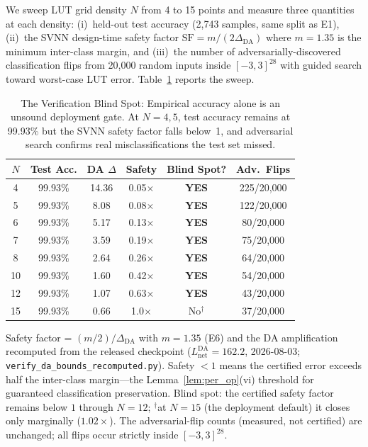 \documentclass[journal,onecolumn]{IEEEtran}
\begin{document}
We sweep LUT grid density $N$ from 4 to 15 points and measure three quantities
at each density: (i)~held-out test accuracy (2,743 samples, same split as E1),
(ii)~the SVNN design-time safety factor $\text{SF} = m/(2\Delta_{\text{DA}})$
where $m=1.35$ is the minimum inter-class margin, and (iii)~the number of
adversarially-discovered classification flips from 20,000 random inputs inside
$[-3,3]^{28}$ with guided search toward worst-case LUT error.
Table~\ref{tab:blind_spot} reports the sweep.

\begin{table}[t]
\centering
\caption{The Verification Blind Spot: Empirical accuracy alone is an unsound
deployment gate. At $N=4,5$, test accuracy remains at 99.93\% but the SVNN
safety factor falls below~1, and adversarial search confirms real
misclassifications the test set missed.}
\label{tab:blind_spot}
\footnotesize
\begin{tabular}{@{}cccccc@{}}
\toprule
\textbf{$N$} & \textbf{Test Acc.} & \textbf{DA $\Delta$} &
\textbf{Safety} & \textbf{Blind Spot?} & \textbf{Adv.\ Flips} \\
\midrule
4  & 99.93\% & 14.36 & 0.05$\times$ & \textbf{YES} & 225/20,000 \\
5  & 99.93\% & 8.08  & 0.08$\times$ & \textbf{YES} & 122/20,000 \\
6  & 99.93\% & 5.17  & 0.13$\times$ & \textbf{YES} & 80/20,000 \\
7  & 99.93\% & 3.59  & 0.19$\times$ & \textbf{YES} & 75/20,000 \\
8  & 99.93\% & 2.64  & 0.26$\times$ & \textbf{YES} & 64/20,000 \\
10 & 99.93\% & 1.60  & 0.42$\times$ & \textbf{YES} & 54/20,000 \\
12 & 99.93\% & 1.07  & 0.63$\times$ & \textbf{YES} & 43/20,000 \\
15 & 99.93\% & 0.66  & 1.0$\times$ & No$^{\dag}$ & 37/20,000 \\
\bottomrule
\end{tabular}
\vspace{2pt}
{\scriptsize Safety factor = $(m/2)/\Delta_{\text{DA}}$ with $m=1.35$ (E6)
and the DA amplification recomputed from the released checkpoint
($L_{\text{net}}^{\text{DA}} = 162.2$, 2026-08-03;
\texttt{verify\_da\_bounds\_recomputed.py}).
Safety $<1$ means the certified error exceeds half the inter-class margin---the
Lemma~\ref{lem:per_op}(vi) threshold for guaranteed classification preservation.
Blind spot: the certified safety factor remains below $1$ through
$N = 12$; $^{\dag}$at $N = 15$ (the deployment default) it closes only
marginally ($1.02\times$). The adversarial-flip counts (measured, not
certified) are unchanged; all flips occur strictly inside $[-3,3]^{28}$.}
\end{table}
\end{document}
